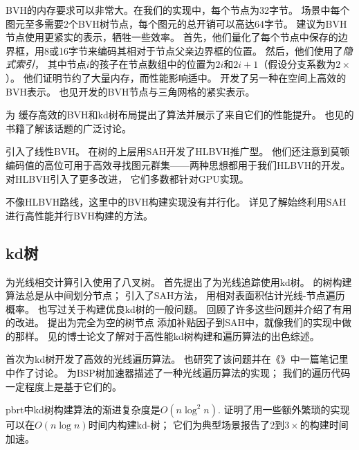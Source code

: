 BVH的内存要求可以非常大。在我们的实现中，每个节点为32字节。
场景中每个图元至多需要2个BVH树节点，每个图元的总开销可以高达64字节。
\citet{10.5555/2383894.2383909}建议为BVH节点使用更紧实的表示，牺牲一些效率。
首先，他们量化了每个节点中保存的边界框，用8或16字节来编码其相对于节点父亲边界框的位置。
然后，他们使用了{\itshape 隐式索引}，
其中节点$i$的孩子在节点数组中的位置为$2i$和$2i+1$（假设分支系数为$2\times$）。
他们证明节约了大量内存，而性能影响适中。
\citet{10.2312:PE:VMV:VMV10:227-234}开发了另一种在空间上高效的BVH表示。
也见\citet{10.5555/1839214.1839242}开发的BVH节点与三角网格的紧实表示。

\citet{10.1111/j.1467-8659.2006.00970.x}为
缓存高效的BVH和kd树布局提出了算法并展示了来自它们的性能提升。
也见\citet{10.5555/1121584}的书籍了解该话题的广泛讨论。

\citet{10.1111/j.1467-8659.2009.01377.x}引入了线性BVH。
\citet{10.5555/1921479.1921493}在树的上层用SAH开发了HLBVH推广型。
他们还注意到莫顿编码值的高位可用于高效寻找图元群集——两种思想都用于我们HLBVH的开发。
\citet{10.1145/2018323.2018333}对HLBVH引入了更多改进，
它们多数都针对GPU实现。

不像HLBVH路线，这里中的BVH构建实现没有并行化。
详见\citet{5669303}了解始终利用SAH进行高性能并行BVH构建的方法。

\subsection{kd树}\label{sub:kd树}
\citet{6429331}为光线相交计算引入使用了八叉树。
\citet{kaplan1985use}首先提出了为光线追踪使用kd树。
\citeauthor{kaplan1985use}的树构建算法总是从中间划分节点；
\citet{MacDonald1990}引入了SAH方法，
用相对表面积估计光线-节点遍历概率。
\citet{Naylor1993:27}也写过关于构建优良kd树的一般问题。
\citet{HavranImproving2002}回顾了许多这些问题并介绍了有用的改进。
\citet{hurley2002fast}提出为完全为空的树节点
添加补贴因子到SAH中，就像我们的实现中做的那样。
见\citet{Havran2000:PhD}的博士论文了解对于高性能kd树构建和遍历算法的出色综述。


\citet{10.1007/978-3-642-71071-1_4}首次为kd树开发了高效的光线遍历算法。
\citet{ArvoRay1988}也研究了该问题并在《{\itshape{}}》中一篇笔记里中作了讨论。
\citet{SUNG1992271}为BSP树加速器描述了一种光线遍历算法的实现；
我们的遍历代码一定程度上是基于它们的。

pbrt中kd树构建算法的渐进复杂度是$O(n\log^2n)$.
\citet{4061547}证明了用一些额外繁琐的实现可以在$O(n\log n)$时间内构建kd-树；
它们为典型场景报告了$2$到$3\times$的构建时间加速。

